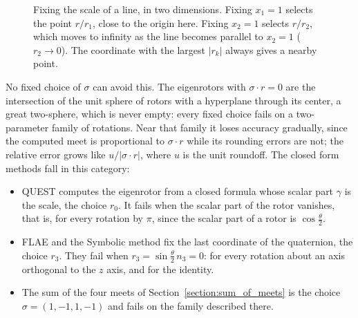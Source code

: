 \documentclass{birkjour}
\theoremstyle{definition}
\theoremstyle{remark}
\numberwithin{equation}{section}
\begin{document}
\begin{figure}[t]
\centering
{}
\caption{Fixing the scale of a line, in two dimensions. Fixing $x_1 = 1$ selects the point $r / r_1$, close to the origin here. Fixing $x_2 = 1$ selects $r / r_2$, which moves to infinity as the line becomes parallel to $x_2 = 1$ ($r_2 \to 0$). The coordinate with the largest $|r_k|$ always gives a nearby point.}
\label{fig:charts}
\end{figure}

No fixed choice of $\sigma$ can avoid this. The eigenrotors with $\sigma \cdot r = 0$ are the intersection of the unit sphere of rotors with a hyperplane through its center, a great two-sphere, which is never empty: every fixed choice fails on a two-parameter family of rotations. Near that family it loses accuracy gradually, since the computed meet is proportional to $\sigma \cdot r$ while its rounding errors are not; the relative error grows like $u / |\sigma \cdot r|$, where $u$ is the unit roundoff. The closed form methods fall in this category:
\begin{itemize}
\item QUEST \cite{Shuster1981} computes the eigenrotor from a closed formula whose scalar part $\gamma$ is the scale, the choice $r_0$. It fails when the scalar part of the rotor vanishes, that is, for every rotation by $\pi$, since the scalar part of a rotor is $\cos\frac{\theta}{2}$.
\item FLAE \cite{Wu2017} and the Symbolic method \cite{Wu2018FS3R} fix the last coordinate of the quaternion, the choice $r_3$. They fail when $r_3 = \sin\frac{\theta}{2}\, n_3 = 0$: for every rotation about an axis orthogonal to the $z$ axis, and for the identity.
\item The sum of the four meets of Section~\ref{section:sum_of_meets} is the choice $\sigma = (1, -1, 1, -1)$ and fails on the family described there.
\end{itemize}
\end{document}
